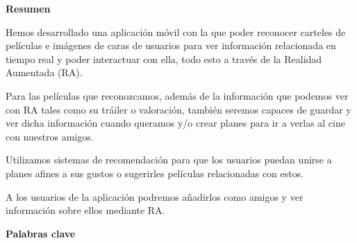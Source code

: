
\newpage

\thispagestyle{empty}

\begin{center}

{\bf \Huge Resumen}

  \end{center}
\vspace{1cm}

Hemos desarrollado una aplicación móvil con la que poder
 reconocer carteles de películas e imágenes de caras de usuarios para
 ver información relacionada en tiempo real y poder
 interactuar con ella, todo esto a través de la Realidad
 Aumentada (RA).
\begin{flushleft}
Para las películas que reconozcamos, además de la información
 que podemos ver con RA tales como su tráiler o valoración,
 también seremos capaces de guardar y ver dicha información
 cuando queramos y/o crear planes para ir a verlas al cine
 con nuestros amigos.

Utilizamos sistemas de recomendación para que los usuarios puedan
 unirse a planes afines a sus gustos o sugerirles películas
 relacionadas con estos.

A los usuarios de la aplicación podremos añadirlos como amigos y ver
 información sobre ellos mediante RA.
\end{flushleft}

\vspace{1cm}


\begin{center}

{\bf \Large Palabras clave}

   \end{center}

   \vspace{0.5cm}
   
